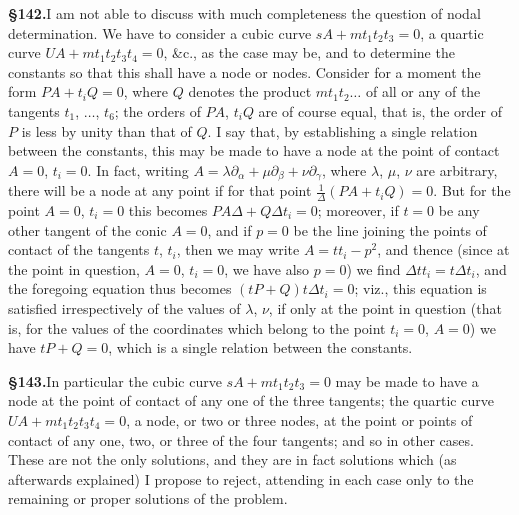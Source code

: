 \documentclass[11pt,a4paper]{article}
\begin{document}
\textbf{\S 142.}\quad I am not able to discuss with much completeness the question of nodal determination. We have to consider a cubic curve $sA + mt_1t_2t_3 = 0$, a quartic curve $UA + mt_1t_2t_3t_4 = 0$, \&c., as the case may be, and to determine the constants so that this shall have a node or nodes. Consider for a moment the form $PA + t_iQ = 0$, where $Q$ denotes the product $mt_1t_2\ldots$ of all or any of the tangents $t_1$, $\ldots$, $t_6$; the orders of $PA$, $t_iQ$ are of course equal, that is, the order of $P$ is less by unity than that of $Q$. I say that, by establishing a single relation between the constants, this may be made to have a node at the point of contact $A = 0$, $t_i = 0$. In fact, writing $A = \lambda\partial_\alpha + \mu\partial_\beta + \nu\partial_\gamma$, where $\lambda$, $\mu$, $\nu$ are arbitrary, there will be a node at any point if for that point $\frac{1}{\Delta}(PA + t_iQ) = 0$. But for the point $A = 0$, $t_i = 0$ this becomes $PA\Delta + Q\Delta t_i = 0$; moreover, if $t = 0$ be any other tangent of the conic $A = 0$, and if $p = 0$ be the line joining the points of contact of the tangents $t$, $t_i$, then we may write $A = tt_i - p^2$, and thence (since at the point in question, $A = 0$, $t_i = 0$, we have also $p = 0$) we find $\Delta tt_i = t\Delta t_i$, and the foregoing equation thus becomes $(tP + Q)t\Delta t_i = 0$; viz., this equation is satisfied irrespectively of the values of $\lambda$, $\nu$, if only at the point in question (that is, for the values of the coordinates which belong to the point $t_i = 0$, $A = 0$) we have $tP + Q = 0$, which is a single relation between the constants.

\textbf{\S 143.}\quad In particular the cubic curve $sA + mt_1t_2t_3 = 0$ may be made to have a node at the point of contact of any one of the three tangents; the quartic curve $UA + mt_1t_2t_3t_4 = 0$, a node, or two or three nodes, at the point or points of contact of any one, two, or three of the four tangents; and so in other cases. These are not the only solutions, and they are in fact solutions which (as afterwards explained) I propose to reject, attending in each case only to the remaining or proper solutions of the problem.
\end{document}

